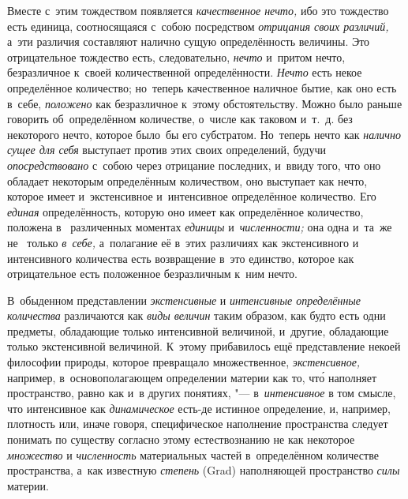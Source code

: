 \begin{midsloppypar}
Вместе с~этим тождеством появляется {\em качественное нечто,} ибо это тождество
есть единица, соотносящаяся с~собою посредством {\em отрицания своих различий,}
а~эти различия составляют налично сущую определённость величины. Это
отрицательное тождество есть, следовательно, {\em нечто} и~притом нечто,
безразличное к~своей количественной определённости. {\em Нечто} есть некое
определённое количество; но~теперь качественное наличное бытие, как оно есть
в~себе, {\em положено} как безразличное к~этому обстоятельству. Можно было
раньше говорить об~определённом количестве, о~числе как таковом и~т.~д. без
некоторого нечто, которое было~бы его субстратом. Но~теперь нечто как
{\em налично сущее для себя} выступает против этих своих определений, будучи
{\em опосредствовано} с~собою через отрицание последних, и~ввиду того, что оно
обладает некоторым определённым количеством, оно выступает как нечто, которое
имеет и~экстенсивное и~интенсивное определённое количество. Его {\em единая}
определённость, которую оно имеет как определённое количество, положена в~%
различенных моментах {\em единицы} и~{\em численности;} она одна и~та~же не~%
только {\em в~себе,} а~полагание её в~этих различиях как экстенсивного и~%
интенсивного количества есть возвращение в~это единство, которое как
отрицательное есть положенное безразличным к~ним нечто.
\end{midsloppypar}


В~обыденном представлении {\em экстенсивные} и {\em интенсивные определённые
количества} различаются как {\em виды величин} таким образом, как будто есть
одни предметы, обладающие только интенсивной величиной, и~другие, обладающие
только экстенсивной величиной. К~этому прибавилось ещё представление
некоей философии природы, которое превращало множественное,
{\em экстенсивное,} например, в~основополагающем определении материи как то, чт\'{о} наполняет
пространство, равно как и~в других понятиях, "--- в~{\em интенсивное} в
том смысле, что интенсивное как {\em динамическое} есть-де истинное определение,
и, например, плотность или, иначе говоря, специфическое наполнение пространства
следует понимать по существу согласно этому естествознанию не как некоторое
{\em множество} и {\em численность} материальных частей в~определённом
количестве пространства, а~как известную {\em степень} (Grad) наполняющей
пространство {\em силы} материи.


